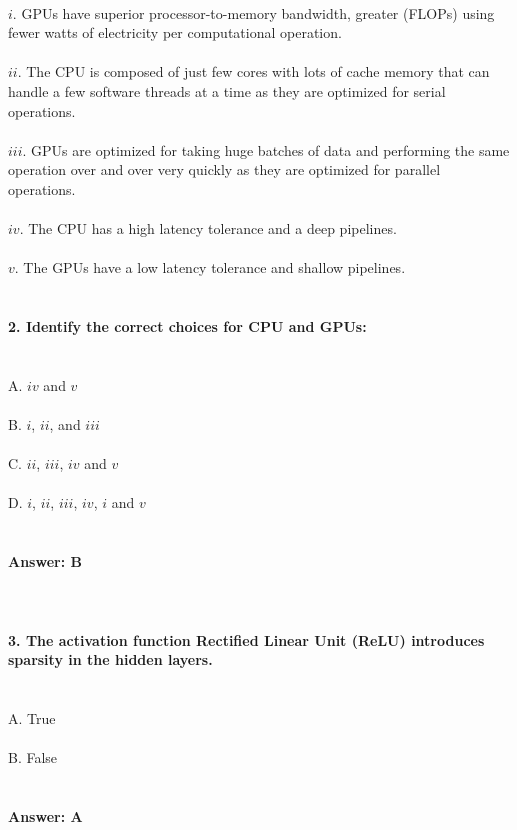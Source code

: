 \documentclass[prl,twocolumn,showpacs,preprintnumbers,superscriptaddress]{revtex4}
\theoremstyle{plain}
\theoremstyle{definition}
\begin{document}
\begin{widetext}
\\
$i$. GPUs have superior processor-to-memory bandwidth, greater (FLOPs) using fewer watts of electricity per computational operation.
\\
\\
$ii$. The CPU is composed of just few cores with lots of cache memory that 
can handle a few software threads at a time as they are optimized for serial operations.
\\
\\
$iii$. GPUs are optimized for taking huge batches of data and 
performing the same operation over and over very quickly as they are optimized for parallel operations.
\\
\\
$iv$. The CPU has a high latency tolerance and a deep pipelines.
\\
\\
$v.$ The GPUs have a low latency tolerance and shallow pipelines.
\\
\\
\\
\textbf{2. Identify the correct choices for CPU and GPUs:}
\\
\\
\\
A. $iv$ and $v$
\\
\\
B. $i$, $ii$, and $iii$
\\
\\
C. $ii$, $iii$, $iv$ and $v$
\\
\\
D. $i$, $ii$, $iii$, $iv$, $i$ and $v$
\\
\\
\\
\textbf{Answer: B}
\\
\\
\\
\\
\textbf{3. The activation function Rectified Linear Unit (ReLU) introduces sparsity in the hidden layers.}
\\
\\
\\
A. True
\\
\\
B. False
\\
\\
\\
\textbf{Answer: A}
\\

\end{widetext}
\end{document}
